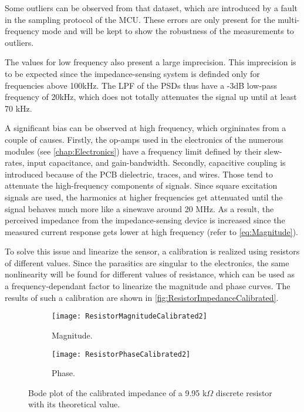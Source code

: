 Some outliers can be observed from that dataset, which are introduced by a fault in the sampling protocol of the MCU. These errors are only present for the multi-frequency mode and will be kept to show the robustness of the measurements to outliers. \par

The values for low frequency also present a large imprecision. This imprecision is to be expected since the impedance-sensing system is definded only for frequencies above 100kHz. The LPF of the PSDs thus have a -3dB low-pass frequency of 20kHz, which does not totally attenuates the signal up until at least 70 kHz. \par

A significant bias can be observed at high frequency, which orgininates from a couple of causes. Firstly, the op-amps used in the electronics of the numerous modules (see \autoref{chap:Electronics}) have a frequency limit defined by their slew-rates, input capacitance, and gain-bandwidth. Secondly, capacitive coupling is introduced because of the PCB dielectric, traces, and wires. Those tend to attenuate the high-frequency components of signals. Since square excitation signals are used, the harmonics at higher frequencies get attenuated until the signal behaves much more like a sinewave around 20 MHz. As a result, the perceived impedance from the impedance-sensing device is increased since the measured current response gets lower at high frequency (refer to \autoref{eq:Magnitude}). \par

To solve this issue and linearize the sensor, a calibration is realized using resistors of different values. Since the parasitics are singular to the electronics, the same nonlinearity will be found for different values of resistance, which can be used as a frequency-dependant factor to linearize the magnitude and phase curves. The results of such a calibration are shown in \autoref{fig:ResistorImpedanceCalibrated}. \par
\begin{figure}[h]
\centering
\begin{subfigure}{0.99\textwidth}
\centering
    \texttt{[image: ResistorMagnitudeCalibrated2]}
    \caption{Magnitude.}
    \label{fig:ResistorMagnitudeCalibrated2}
\end{subfigure}
\begin{subfigure}{0.99\textwidth}
\centering
    \texttt{[image: ResistorPhaseCalibrated2]}
    \caption{Phase.}
    \label{fig:ResistorPhaseCalibrated2}
\end{subfigure}
\caption{Bode plot of the calibrated impedance of a 9.95 k$\Omega$ discrete resistor with its theoretical value.}
\label{fig:ResistorImpedanceCalibrated}
\end{figure}

